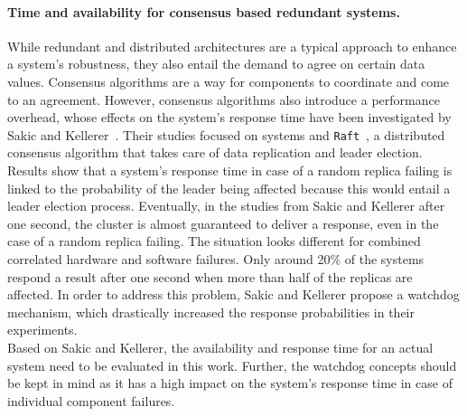 \paragraph{Time and availability for consensus based redundant systems.}
While redundant and distributed architectures are a typical approach to enhance a system's robustness, they also entail the demand to agree on certain data values.
Consensus algorithms are a way for components to coordinate and come to an agreement.
However, consensus algorithms also introduce a performance overhead, whose effects on the system's response time have been investigated by Sakic and Kellerer~\cite{SakicTimeInConsensus}.
Their studies focused on  systems and \texttt{Raft}~\cite{RaftConsensusPaper}, a distributed consensus algorithm that takes care of data replication and leader election.
Results show that a system's response time in case of a random replica failing is linked to the probability of the leader being affected because this would entail a leader election process.
Eventually, in the studies from Sakic and Kellerer after one second, the cluster is almost guaranteed to deliver a response, even in the case of a random replica failing.
The situation looks different for combined correlated hardware and software failures.
Only around 20\% of the systems respond a result after one second when more than half of the replicas are affected.
In order to address this problem, Sakic and Kellerer propose a watchdog mechanism, which drastically increased the response probabilities in their experiments.
\\

Based on Sakic and Kellerer, the availability and response time for an actual system need to be evaluated in this work.
Further, the watchdog concepts should be kept in mind as it has a high impact on the system's response time in case of individual component failures.